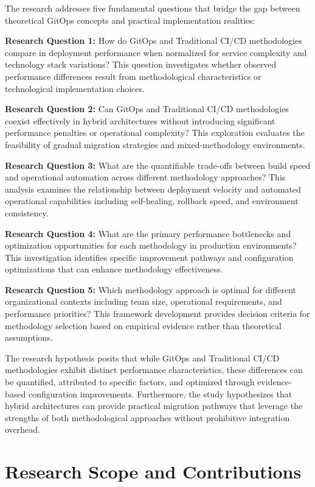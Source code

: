 The research addresses five fundamental questions that bridge the gap between theoretical GitOps concepts and practical implementation realities:

\textbf{Research Question 1:} How do GitOps and Traditional CI/CD methodologies compare in deployment performance when normalized for service complexity and technology stack variations? This question investigates whether observed performance differences result from methodological characteristics or technological implementation choices.

\textbf{Research Question 2:} Can GitOps and Traditional CI/CD methodologies coexist effectively in hybrid architectures without introducing significant performance penalties or operational complexity? This exploration evaluates the feasibility of gradual migration strategies and mixed-methodology environments.

\textbf{Research Question 3:} What are the quantifiable trade-offs between build speed and operational automation across different methodology approaches? This analysis examines the relationship between deployment velocity and automated operational capabilities including self-healing, rollback speed, and environment consistency.

\textbf{Research Question 4:} What are the primary performance bottlenecks and optimization opportunities for each methodology in production environments? This investigation identifies specific improvement pathways and configuration optimizations that can enhance methodology effectiveness.

\textbf{Research Question 5:} Which methodology approach is optimal for different organizational contexts including team size, operational requirements, and performance priorities? This framework development provides decision criteria for methodology selection based on empirical evidence rather than theoretical assumptions.

The research hypothesis posits that while GitOps and Traditional CI/CD methodologies exhibit distinct performance characteristics, these differences can be quantified, attributed to specific factors, and optimized through evidence-based configuration improvements. Furthermore, the study hypothesizes that hybrid architectures can provide practical migration pathways that leverage the strengths of both methodological approaches without prohibitive integration overhead.

\section{Research Scope and Contributions}

